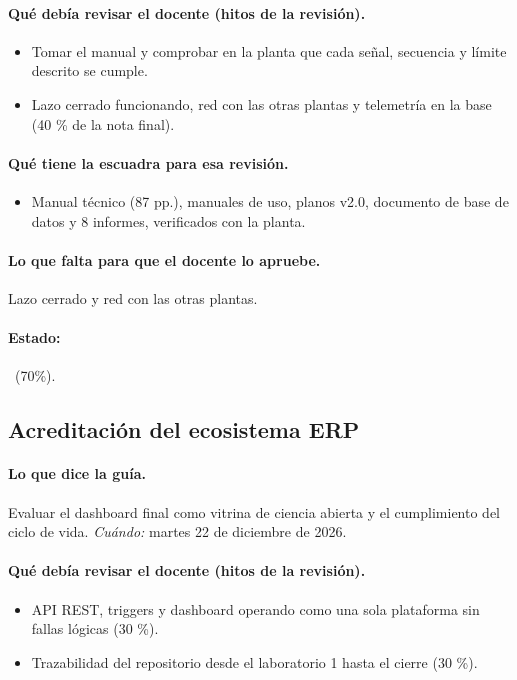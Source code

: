 \documentclass[a4paper,11pt]{article}
\begin{document}
\paragraph{Qué debía revisar el docente (hitos de la revisión).}
\begin{itemize}
\item[$\square$] Tomar el manual y comprobar en la planta que cada señal, secuencia y límite descrito se cumple.
\item[$\square$] Lazo cerrado funcionando, red con las otras plantas y telemetría en la base (40 \% de la nota final).
\end{itemize}
\paragraph{Qué tiene la escuadra para esa revisión.}
\begin{itemize}
\item Manual técnico (87 pp.), manuales de uso, planos v2.0, documento de base de datos y 8 informes, verificados con la planta.
\end{itemize}
\paragraph{Lo que falta para que el docente lo apruebe.} Lazo cerrado y red con las otras plantas.
\paragraph{Estado:} \parcial~(70\%).
\subsection{Acreditación del ecosistema ERP}
\paragraph{Lo que dice la guía.} Evaluar el dashboard final como vitrina de ciencia abierta y el cumplimiento del ciclo de vida. \textit{Cuándo:} martes 22 de diciembre de 2026.
\paragraph{Qué debía revisar el docente (hitos de la revisión).}
\begin{itemize}
\item[$\square$] API REST, triggers y dashboard operando como una sola plataforma sin fallas lógicas (30 \%).
\item[$\square$] Trazabilidad del repositorio desde el laboratorio 1 hasta el cierre (30 \%).
\end{itemize}
\end{document}
